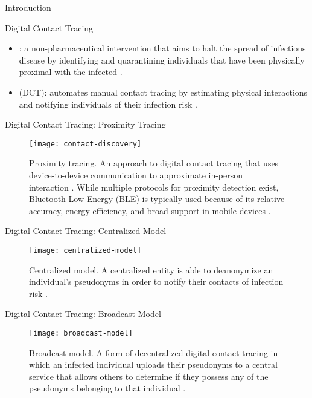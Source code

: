 \documentclass[11pt]{beamer}
\begin{document}
\begin{frame}
	\maketitle
\end{frame}

\begin{section}{Introduction}

\begin{frame}{Digital Contact Tracing}
\begin{itemize}
  \item {}: a non-pharmaceutical intervention that aims to halt the spread of infectious disease by identifying and quarantining individuals that have been physically proximal with the infected \citep{PozoMartin2023}.
  \pause
  \item {} (DCT): automates manual contact tracing by estimating physical interactions and notifying individuals of their infection risk \citep{Reichert2021}.
\end{itemize}
\end{frame}

\begin{frame}{Digital Contact Tracing: Proximity Tracing}
\begin{figure}
  \centering
  \texttt{[image: contact-discovery]}
  \caption[Proximity tracing]{Proximity tracing. An approach to digital contact tracing that uses device-to-device communication to approximate in-person interaction \cite{Reichert2021}. While multiple protocols for proximity detection exist, Bluetooth Low Energy (BLE) is typically used because of its relative accuracy, energy efficiency, and broad support in mobile devices \citep{Shubina2020, Reichert2021}.}
\end{figure}
\end{frame}

\begin{frame}{Digital Contact Tracing: Centralized Model}
\begin{figure}
  \centering
  \texttt{[image: centralized-model]}
  \caption[Centralized model]{Centralized model. A centralized entity is able to deanonymize an individual's pseudonyms in order to notify their contacts of infection risk \cite{Reichert2021}.}
\end{figure}
\end{frame}

\begin{frame}{Digital Contact Tracing: Broadcast Model}
\begin{figure}
  \centering
  \texttt{[image: broadcast-model]}
  \caption[Broadcast model]{Broadcast model. A form of decentralized digital contact tracing in which an infected individual uploads their pseudonyms to a central service that allows others to determine if they possess any of the pseudonyms belonging to that individual \cite{Reichert2021}.}
\end{figure}
\end{frame}


\end{section}
\end{document}
